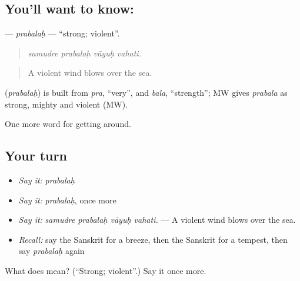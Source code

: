 \subsection*{You'll want to know: }
\textbf{} — \emph{prabalaḥ} — \textquotedblleft{}strong; violent\textquotedblright{}.

\begin{quote}
   
\end{quote}

\begin{quote}
\emph{samudre prabalaḥ vāyuḥ vahati.}
\end{quote}

\begin{quote}
A violent wind blows over the sea.
\end{quote}

\begin{cousinweb}
\textbf{} (\emph{prabalaḥ}) is built from \emph{pra}, \textquotedblleft{}very\textquotedblright{}, and \emph{bala}, \textquotedblleft{}strength\textquotedblright{}; MW gives \emph{prabala} as strong, mighty and violent (MW).
\end{cousinweb}

\begin{grammarlens}[title={What you've built}]
One more word for getting around.
\end{grammarlens}

\subsection*{Your turn}
\begin{itemize}
\raggedright
  \item \emph{Say it:} \emph{prabalaḥ}
  \item \emph{Say it:} \emph{prabalaḥ}, once more
  \item \emph{Say it:} \emph{samudre prabalaḥ vāyuḥ vahati.} — A violent wind blows over the sea.
  \item \emph{Recall:} say the Sanskrit for a breeze, then the Sanskrit for a tempest, then say \emph{prabalaḥ} again
\end{itemize}

\begin{tcolorbox}[breakable,colback=teal!4,colframe=teal!35!black,title={Before you move on}]
What does  mean? (\textquotedblleft{}Strong; violent\textquotedblright{}.) Say it once more.
\end{tcolorbox}
